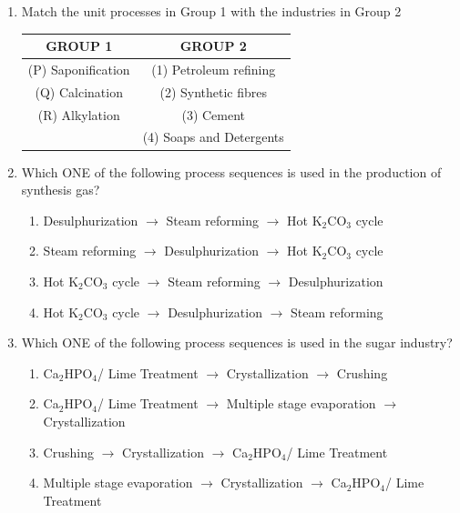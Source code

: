 \documentclass[journal,12pt,onecolumn]{IEEEtran}
\theoremstyle{remark}
\begin{document}
\begin{enumerate}
\item Match the unit processes in Group 1 with the industries in Group 2
\begin{center}
\begin{tabular}{c|c}
GROUP 1 & GROUP 2 \\
\hline
(P) Saponification & (1) Petroleum refining \\
(Q) Calcination & (2) Synthetic fibres \\
(R) Alkylation & (3) Cement \\
& (4) Soaps and Detergents \\
\end{tabular}
\end{center}
\hfill{}
\begin{enumerate}
\end{enumerate}

\item \quad Which ONE of the following process sequences is used in the production of synthesis gas?
\hfill{}
\begin{enumerate}
\item Desulphurization $\rightarrow$ Steam reforming $\rightarrow$ Hot K$_2$CO$_3$ cycle 
\item Steam reforming $\rightarrow$ Desulphurization $\rightarrow$ Hot K$_2$CO$_3$ cycle
\item Hot K$_2$CO$_3$ cycle $\rightarrow$ Steam reforming $\rightarrow$ Desulphurization
\item Hot K$_2$CO$_3$ cycle $\rightarrow$ Desulphurization $\rightarrow$ Steam reforming
\end{enumerate}

\item Which ONE of the following process sequences is used in the sugar industry?
\hfill{}
\begin{enumerate}
\item Ca$_2$HPO$_4$/ Lime Treatment $\rightarrow$ Crystallization $\rightarrow$ Crushing
\item Ca$_2$HPO$_4$/ Lime Treatment $\rightarrow$ Multiple stage evaporation $\rightarrow$ Crystallization
\item Crushing $\rightarrow$ Crystallization $\rightarrow$ Ca$_2$HPO$_4$/ Lime Treatment
\item Multiple stage evaporation $\rightarrow$ Crystallization $\rightarrow$ Ca$_2$HPO$_4$/ Lime Treatment
\end{enumerate}

\end{enumerate}
\end{document}
